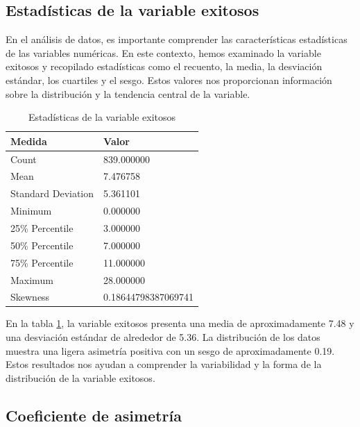 \subsection{Estadísticas de la variable exitosos}

En el análisis de datos, es importante comprender las características
estadísticas de las variables numéricas. En este contexto, hemos examinado la
variable exitosos y recopilado estadísticas como el recuento, la media, la
desviación estándar, los cuartiles y el sesgo. Estos valores nos proporcionan
información sobre la distribución y la tendencia central de la variable.

\begin{table}[htbp]
    \centering
    \caption{Estadísticas de la variable exitosos}
    \begin{tabular}{ll}
        \hline
        \textbf{Medida}    & \textbf{Valor}      \\
        \hline
        Count              & 839.000000          \\
        Mean               & 7.476758            \\
        Standard Deviation & 5.361101            \\
        Minimum            & 0.000000            \\
        25\% Percentile    & 3.000000            \\
        50\% Percentile    & 7.000000            \\
        75\% Percentile    & 11.000000           \\
        Maximum            & 28.000000           \\
        Skewness           & 0.18644798387069741 \\
        \hline
    \end{tabular}%
    \label{tab:estadistica_variable_exito}%
\end{table}%

En la tabla \ref{tab:estadistica_variable_exito}, la variable exitosos presenta
una media de aproximadamente 7.48 y una desviación estándar de alrededor de
5.36. La distribución de los datos muestra una ligera asimetría positiva con un
sesgo de aproximadamente 0.19. Estos resultados nos ayudan a comprender la
variabilidad y la forma de la distribución de la variable exitosos.

\subsection{Coeficiente de asimetría}

